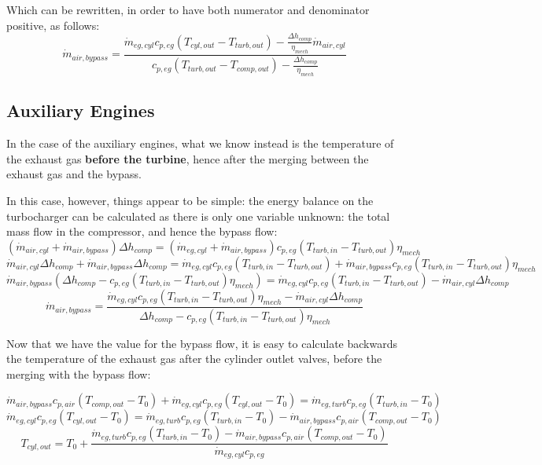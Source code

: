 \documentclass[]{article}
\begin{document}
Which can be rewritten, in order to have both numerator and denominator positive, as follows:
\begin{equation}
\dot{m}_{air,bypass} = \frac{\dot{m}_{eg,cyl} c_{p,eg} (T_{cyl,out} - T_{turb,out}) - \frac{\Delta h_{comp}}{\eta_{mech}}\dot{m}_{air,cyl}}{c_{p,eg} (T_{turb,out} - T_{comp,out}) - \frac{\Delta h_{comp}}{\eta_{mech}}} 
\end{equation}



\subsection{Auxiliary Engines}

In the case of the auxiliary engines, what we know instead is the temperature of the exhaust gas \textbf{before the turbine}, hence after the merging between the exhaust gas and the bypass.

In this case, however, things appear to be simple: the energy balance on the turbocharger can be calculated as there is only one variable unknown: the total mass flow in the compressor, and hence the bypass flow:
$$
(\dot{m}_{air,cyl} + \dot{m}_{air,bypass}) \Delta h_{comp} = (\dot{m}_{eg,cyl} + \dot{m}_{air,bypass}) c_{p,eg} (T_{turb,in} - T_{turb,out}) \eta_{mech}
$$
$$
\dot{m}_{air,cyl} \Delta h_{comp} + \dot{m}_{air,bypass} \Delta h_{comp} = \dot{m}_{eg,cyl} c_{p,eg} (T_{turb,in} - T_{turb,out}) + \dot{m}_{air,bypass} c_{p,eg} (T_{turb,in} - T_{turb,out}) \eta_{mech}
$$
$$
\dot{m}_{air,bypass} (\Delta h_{comp} - c_{p,eg} (T_{turb,in} - T_{turb,out}) \eta_{mech}) = \dot{m}_{eg,cyl} c_{p,eg} (T_{turb,in} - T_{turb,out}) - \dot{m}_{air,cyl} \Delta h_{comp}
$$
\begin{equation}
\dot{m}_{air,bypass} = \frac{\dot{m}_{eg,cyl} c_{p,eg} (T_{turb,in} - T_{turb,out}) \eta_{mech} - \dot{m}_{air,cyl} \Delta h_{comp}}{\Delta h_{comp} - c_{p,eg} (T_{turb,in} - T_{turb,out}) \eta_{mech}}
\end{equation}

Now that we have the value for the bypass flow, it is easy to calculate backwards the temperature of the exhaust gas after the cylinder outlet valves, before the merging with the bypass flow:

$$
\dot{m}_{air,bypass} c_{p,air} (T_{comp,out} - T_0) + \dot{m}_{eg,cyl} c_{p,eg}  (T_{cyl,out} - T_0) = \dot{m}_{eg,turb} c_{p,eg} (T_{turb,in} - T_0)
$$
$$
\dot{m}_{eg,cyl} c_{p,eg}  (T_{cyl,out} - T_0) = \dot{m}_{eg,turb} c_{p,eg} (T_{turb,in} - T_0) - \dot{m}_{air,bypass} c_{p,air} (T_{comp,out} - T_0)
$$
\begin{equation}
T_{cyl,out} = T_0 + \frac{\dot{m}_{eg,turb} c_{p,eg} (T_{turb,in} - T_0) - \dot{m}_{air,bypass} c_{p,air} (T_{comp,out} - T_0)}{\dot{m}_{eg,cyl} c_{p,eg}}
\end{equation}
\end{document}
